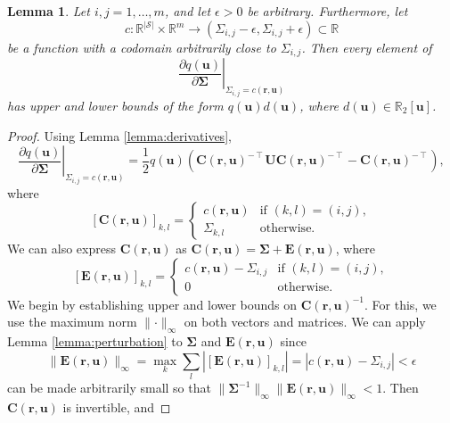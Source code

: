 \documentclass{mpaper}
\newtheorem{lemma}[theorem]{Lemma}
\begin{document}
\begin{lemma} \label{lemma:bound3}
  Let $i, j = 1, \dots, m$, and let $\epsilon > 0$ be arbitrary. Furthermore,
  let
  \[
    c : \mathbb{R}^{|\mathcal{S}|} \times \mathbb{R}^m \to (\Sigma_{i,j} - \epsilon,
    \Sigma_{i,j} + \epsilon) \subset \mathbb{R}
  \]
  be a function with a codomain arbitrarily close to $\Sigma_{i,j}$. Then every
  element of
  \[
    \left. \frac{\partial q(\mathbf{u})}{\partial \bm\Sigma} \right|_{\Sigma_{i,j} =
    c(\mathbf{r}, \mathbf{u})}
  \]
  has upper and lower bounds of the form $q(\mathbf{u})d(\mathbf{u})$, where
  $d(\mathbf{u}) \in \mathbb{R}_2[\mathbf{u}]$.
\end{lemma}
\begin{proof}
  Using Lemma \ref{lemma:derivatives},
  \[
    \left. \frac{\partial q(\mathbf{u})}{\partial \bm\Sigma} \right|_{\Sigma_{i,j} =
    c(\mathbf{r}, \mathbf{u})} =
    \frac{1}{2}q(\mathbf{u})(\mathbf{C}(\mathbf{r},
    \mathbf{u})^{-\intercal}\mathbf{UC}(\mathbf{r}, \mathbf{u})^{-\intercal} -
    \mathbf{C}(\mathbf{r}, \mathbf{u})^{-\intercal}),
  \]
  where
  \[
    [\mathbf{C}(\mathbf{r}, \mathbf{u})]_{k,l} =
    \begin{cases}
      c(\mathbf{r}, \mathbf{u}) & \text{if } (k, l) = (i, j), \\
      \Sigma_{k,l} & \text{otherwise.}
    \end{cases}
  \]
  We can also express $\mathbf{C}(\mathbf{r},\mathbf{u})$ as
  $\mathbf{C}(\mathbf{r}, \mathbf{u}) = \bm\Sigma + \mathbf{E}(\mathbf{r},
  \mathbf{u})$, where
  \[
    [\mathbf{E}(\mathbf{r}, \mathbf{u})]_{k,l} =
    \begin{cases}
      c(\mathbf{r}, \mathbf{u}) - \Sigma_{i,j} & \text{if } (k, l) = (i, j), \\
      0 & \text{otherwise.}
    \end{cases}
  \]
  We begin by establishing upper and lower bounds on $\mathbf{C}(\mathbf{r},
  \mathbf{u})^{-1}$. For this, we use the maximum norm $\lVert \cdot
  \rVert_\infty$ on both vectors and matrices. We can apply Lemma
  \ref{lemma:perturbation} to $\bm\Sigma$ and $\mathbf{E}(\mathbf{r},
  \mathbf{u})$ since
  \[
    \lVert \mathbf{E}(\mathbf{r}, \mathbf{u}) \rVert_\infty = \max_k \sum_l
    |[\mathbf{E}(\mathbf{r}, \mathbf{u})]_{k,l}| = |c(\mathbf{r}, \mathbf{u}) -
    \Sigma_{i,j}| < \epsilon
  \]
  can be made arbitrarily small so that $\lVert \bm\Sigma^{-1} \rVert_\infty
  \lVert \mathbf{E}(\mathbf{r}, \mathbf{u}) \rVert_\infty < 1$. Then
  $\mathbf{C}(\mathbf{r}, \mathbf{u})$ is invertible, and

\end{proof}
\end{document}
